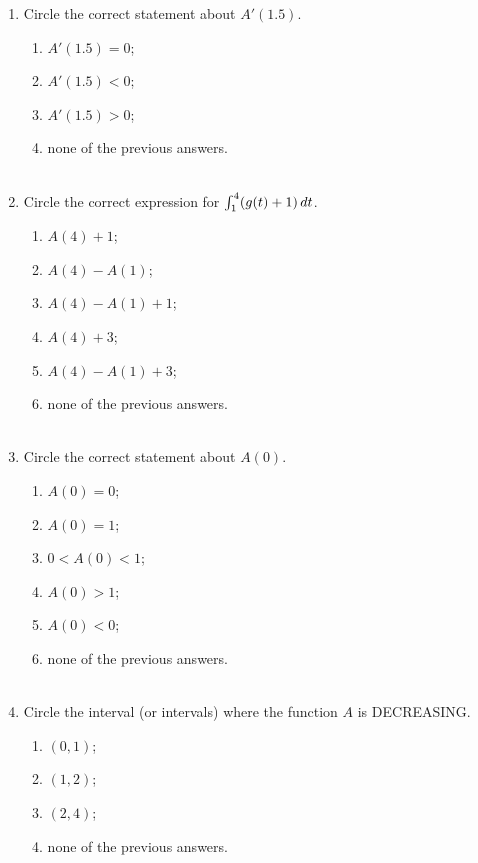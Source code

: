 \documentclass{ximera}
\begin{document}
\begin{problem}
\begin{enumerate}
    \item
      Circle the correct statement about $A'(1.5)$.
      \begin{enumerate}
        \item $A'(1.5) = 0$;
        \item $A'(1.5) < 0$;
        \item $A'(1.5) > 0$;
        \item none of the previous answers.\\ \\
      \end{enumerate}
      
    \item
      Circle the correct expression for $\int_1^4 (g(t) + 1) \,d t$.
      \begin{enumerate}
        \item $A(4) + 1$;
        \item $A(4) - A(1)$;
        \item $A(4) - A(1) + 1$;
        \item $A(4) + 3$;
        \item $A(4) - A(1) + 3$;
        \item none of the previous answers.\\ \\
      \end{enumerate}
      

    \item
      Circle the correct statement about $A(0)$.
      \begin{enumerate}
        \item $A(0) = 0$;
        \item $A(0) = 1$;
        \item $0 < A(0) < 1$;
        \item $A(0) > 1$;
        \item $A(0) < 0$;
        \item none of the previous answers.\\ \\
      \end{enumerate}
      
    \item
      Circle the interval (or intervals) where the function $A$ is DECREASING.
      \begin{enumerate}
        \item $(0, 1)$;
        \item $(1, 2)$;
        \item $(2, 4)$;
        \item none of the previous answers.\\ \\
      \end{enumerate}
      

\end{enumerate}
\end{problem}
\end{document}
